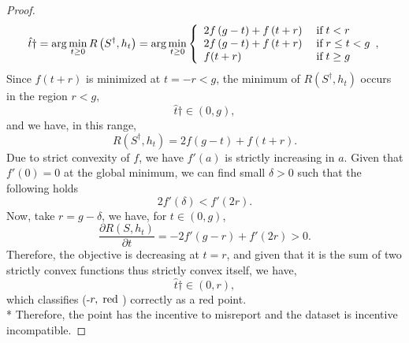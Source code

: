 \documentclass{article}
\begin{document}
\begin{proof}
\begin{equation} \hat{t}\dagger = \arg\displaystyle\min_{t \geq  0} R\left(S^{\dagger}, h_{t}\right) = \arg\displaystyle\min_{t \geq  0}\left\{ \begin{array}{ll}
2 f\left(g - t\right) + f\left(t + r\right)& \text{\;if\;} t < r \\
2 f\left(g - t\right) + f\left(t + r\right)& \text{\;if\;} r \leq  t < g \\
f(t + r)& \text{\;if\;} t \geq  g \\
\end{array},\right. \end{equation}
Since $f\left(t + r\right) $ is minimized at $t  = -r < g $, the minimum of $R\left(S^{\dagger}, h_{t}\right) $ occurs in the region $r  < g, $
\begin{equation} 
\hat{t}\dagger \in \left(0, g \right),
\end{equation}
and we have, in this range,
\begin{equation} 
R\left(S^{\dagger}, h_{t}\right)  = 2 f\left(g - t\right) + f\left(t + r\right).
\end{equation}
Due to strict convexity of $f $, we have $f'\left(a\right)$ is strictly increasing in $a $. Given that $f'\left(0\right) = 0$ at the global minimum, we can find small $\delta > 0$ such that the following holds
\begin{equation} 
2 f'\left(\delta\right) < f'\left(2 r\right) .
\end{equation}
Now, take $r  = g - \delta$, we have, for $t  \in \left(0, g \right)$,
\begin{equation} 
\dfrac{\partial R\left(S, h_{t}\right)}{\partial t} = - 2 f'\left(g - r\right) + f'\left(2 r\right) > 0.
\end{equation}
Therefore, the objective is decreasing at $t  = r $, and given that it is the sum of two strictly convex functions thus strictly convex itself, we have,
\begin{equation} 
\hat{t}\dagger \in \left(0, r \right),
\end{equation}
which classifies (-$r , \text{\;red\;}$) correctly as a red point.
\\* Therefore, the point has the incentive to misreport and the dataset is incentive incompatible.
\end{proof}
\end{document}
